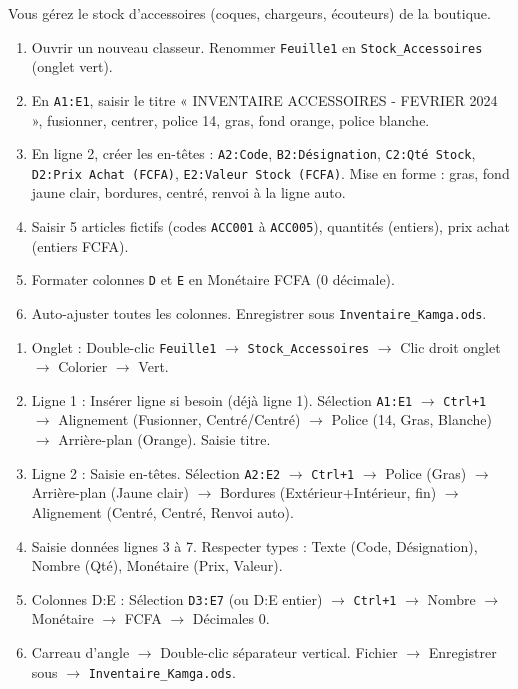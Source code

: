 \documentclass[11pt]{article}
\begin{document}
\begin{exercice}
Vous gérez le stock d'accessoires (coques, chargeurs, écouteurs) de la boutique.
\begin{enumerate}
    \item Ouvrir un nouveau classeur. Renommer \texttt{Feuille1} en \texttt{Stock\_Accessoires} (onglet vert).
    \item En \texttt{A1:E1}, saisir le titre « INVENTAIRE ACCESSOIRES - FEVRIER 2024 », fusionner, centrer, police 14, gras, fond orange, police blanche.
    \item En ligne 2, créer les en-têtes : \texttt{A2:Code}, \texttt{B2:Désignation}, \texttt{C2:Qté Stock}, \texttt{D2:Prix Achat (FCFA)}, \texttt{E2:Valeur Stock (FCFA)}. Mise en forme : gras, fond jaune clair, bordures, centré, renvoi à la ligne auto.
    \item Saisir 5 articles fictifs (codes \texttt{ACC001} à \texttt{ACC005}), quantités (entiers), prix achat (entiers FCFA).
    \item Formater colonnes \texttt{D} et \texttt{E} en Monétaire FCFA (0 décimale).
    \item Auto-ajuster toutes les colonnes. Enregistrer sous \texttt{Inventaire\_Kamga.ods}.
\end{enumerate}
\end{exercice}

\begin{corrige}[Exercice n°1]
\begin{enumerate}
    \item Onglet : Double-clic \texttt{Feuille1} $\to$ \texttt{Stock\_Accessoires} $\to$ Clic droit onglet $\to$ Colorier $\to$ Vert.
    \item Ligne 1 : Insérer ligne si besoin (déjà ligne 1). Sélection \texttt{A1:E1} $\to$ \texttt{Ctrl+1} $\to$ Alignement (Fusionner, Centré/Centré) $\to$ Police (14, Gras, Blanche) $\to$ Arrière-plan (Orange). Saisie titre.
    \item Ligne 2 : Saisie en-têtes. Sélection \texttt{A2:E2} $\to$ \texttt{Ctrl+1} $\to$ Police (Gras) $\to$ Arrière-plan (Jaune clair) $\to$ Bordures (Extérieur+Intérieur, fin) $\to$ Alignement (Centré, Centré, Renvoi auto).
    \item Saisie données lignes 3 à 7. Respecter types : Texte (Code, Désignation), Nombre (Qté), Monétaire (Prix, Valeur).
    \item Colonnes D:E : Sélection \texttt{D3:E7} (ou D:E entier) $\to$ \texttt{Ctrl+1} $\to$ Nombre $\to$ Monétaire $\to$ FCFA $\to$ Décimales 0.
    \item Carreau d'angle $\to$ Double-clic séparateur vertical. Fichier $\to$ Enregistrer sous $\to$ \texttt{Inventaire\_Kamga.ods}.
\end{enumerate}
\end{corrige}
\end{document}
